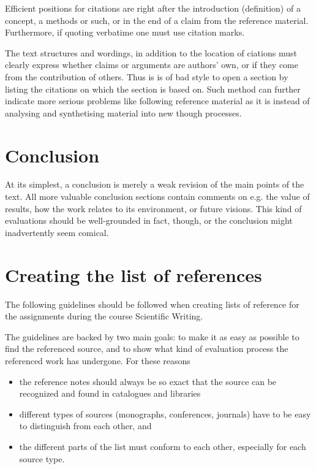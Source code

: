 Efficient positions for citations are right after the introduction
(definition) of a concept, a methods or such, or in the end of a claim
from the reference material. Furthermore, if quoting verbatime one must
use citation marks.

The text structures and wordings, in addition to the location of
ciations must clearly express whether claims or arguments are 
authors' own, or if they come from the contribution of others. Thus is
is of bad style to open a section by listing the citations on which the
section is based on. Such method can further indicate more serious
problems like following reference material as it is instead of analysing
and synthetising material into new though processes. 


\section{Conclusion}

At its simplest, a conclusion is merely a weak revision of the main points of the text.  All more valuable 
conclusion sections contain comments on e.g. the value of results, how the work relates to its environment, or 
future visions. This kind of evaluations should be well-grounded in fact, though, or the conclusion 
might inadvertently seem comical. 

\section{Creating the list of references}

The following guidelines should be followed when creating lists of reference for the 
assignments during the course Scientific Writing.

The guidelines are backed by two main goals: to make it as easy as possible to find the 
referenced source, and to show what kind of evaluation process the referenced work has undergone. For these reasons
\begin{itemize}

\item the reference notes should always be so exact that the source can be recognized and found in catalogues and libraries

\item different types of sources (monographs, conferences, journals) have to be easy to distinguish from each other, and 

\item the different parts of the list must conform to each other, especially for each source type.
\end{itemize}


